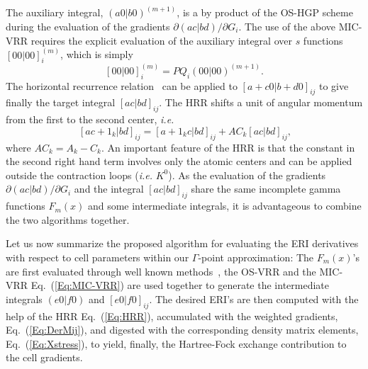 \documentclass[prl,preprint,doublespace]{revtex4} %
\begin{document}
The auxiliary integral, $(a0|b0)^{(m+1)}$, is a by product of the OS-HGP scheme during
the evaluation of the gradients $\partial (ac|bd)/\partial G_i$.
The use of the above MIC-VRR requires the explicit evaluation of the auxiliary integral
over $s$ functions $[00|00]_{i}^{(m)}$, which is simply
\begin{equation*}
    [00|00]_{i}^{(m)}
    =PQ_i(00|00)^{(m+1)}.
\end{equation*}
The horizontal recurrence relation~\cite{MGordon88} can be applied to $[a+c0|b+d0]_{ij}$ to give 
finally the target integral $[ac|bd]_{ij}$.
The HRR shifts a unit of angular momentum from the first to the second center, {\em i.e.}
\begin{equation}~\label{Eq:HRR}
  [ac+1_k|bd]_{ij}=[a+1_kc|bd]_{ij}+AC_k[ac|bd]_{ij},
\end{equation}
where $AC_k=A_k-C_k$. An important feature of the HRR is that the 
constant in the second right hand term involves only the atomic centers
and can be applied outside the contraction loops ({\em i.e.} $K^0$).
As the evaluation of the gradients $\partial (ac|bd)/\partial G_i$ and the integral
$[ac|bd]_{ij}$ share the same incomplete gamma functions 
$F_m(x)$ and some intermediate integrals, it is 
advantageous to combine the two algorithms together.

Let us now summarize the proposed algorithm for evaluating the ERI derivatives
with respect to cell parameters within our $\Gamma$-point approximation:
The $F_m(x)$'s are first evaluated through well known methods~\cite{LMcmurchie78,SObara86},
the OS-VRR and the MIC-VRR Eq.~(\ref{Eq:MIC-VRR}) are used together 
to generate the intermediate integrals $(e0|f0)$ and $[e0|f0]_{ij}$. The
desired ERI's are then computed with the help of the HRR Eq.~(\ref{Eq:HRR}),
accumulated with the weighted gradients, Eq.~(\ref{Eq:DerMij}), and digested
with the corresponding density matrix elements, Eq.~(\ref{Eq:Xstress}), to
yield, finally, the Hartree-Fock exchange contribution to the cell gradients.
\end{document}
